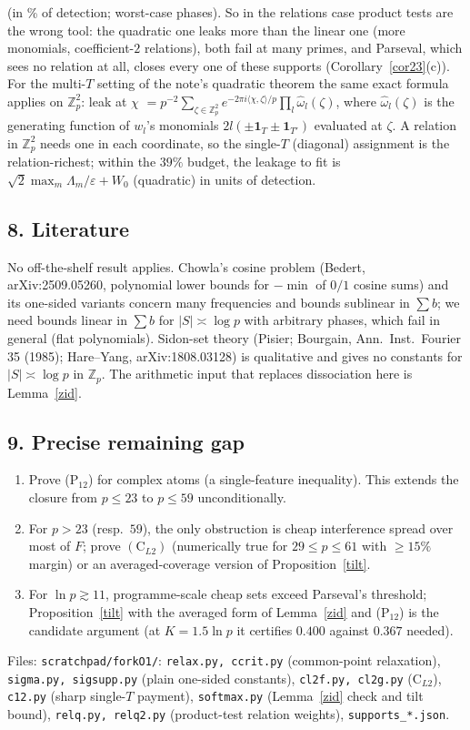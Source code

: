 \documentclass[11pt]{article}
\theoremstyle{remark}\newtheorem{remark}[theorem]{Remark}
\begin{document}
(in \% of detection; worst-case phases).  So in the relations case product tests are the wrong tool: the quadratic one leaks more than the
linear one (more monomials, coefficient-$2$ relations), both fail at many primes, and Parseval, which sees no relation at all, closes every one
of these supports (Corollary~\ref{cor23}(c)).  For the multi-$T$ setting of the note's quadratic theorem the same exact formula applies on
$\mathbb Z_p^2$: leak at $\chi$ $=p^{-2}\sum_{\zeta\in\mathbb Z_p^2}e^{-2\pi i\langle\chi,\zeta\rangle/p}\prod_l\hat\omega_l(\zeta)$, where $\hat\omega_l(\zeta)$ is the
generating function of $w_l$'s monomials $2l(\pm\mathbf1_T\pm\mathbf1_{T'})$ evaluated at $\zeta$.  A relation in $\mathbb Z_p^2$ needs one in
each coordinate, so the single-$T$ (diagonal) assignment is the relation-richest; within the $39\%$ budget, the leakage to fit is
$\sqrt2\max_m\Lambda_m/\varepsilon+W_0$ (quadratic) in units of detection.

\subsection*{8. Literature}
No off-the-shelf result applies.  Chowla's cosine problem (Bedert, arXiv:2509.05260, polynomial lower bounds for $-\min$ of $0/1$ cosine
sums) and its one-sided variants concern many frequencies and bounds sublinear in $\sum b$; we need bounds linear in $\sum b$ for
$|S|\asymp\log p$ with arbitrary phases, which fail in general (flat polynomials).  Sidon-set theory (Pisier; Bourgain, Ann.\ Inst.\ Fourier
35 (1985); Hare--Yang, arXiv:1808.03128) is qualitative and gives no constants for $|S|\asymp\log p$ in $\mathbb Z_p$.  The arithmetic input
that replaces dissociation here is Lemma~\ref{zid}.

\subsection*{9. Precise remaining gap}
\begin{enumerate}
\item[(G1)] Prove (P$_{12}$) for complex atoms (a single-feature inequality).  This extends the closure from $p\le23$ to $p\le59$ unconditionally.
\item[(G2)] For $p>23$ (resp.\ $59$), the only obstruction is cheap interference spread over most of $F$; prove $(\mathrm C_{L2})$ (numerically true
for $29\le p\le61$ with $\ge15\%$ margin) or an averaged-coverage version of Proposition~\ref{tilt}.
\item[(G3)] For $\ln p\gtrsim11$, programme-scale cheap sets exceed Parseval's threshold; Proposition~\ref{tilt} with the averaged form of
Lemma~\ref{zid} and (P$_{12}$) is the candidate argument (at $K=1.5\ln p$ it certifies $0.400$ against $0.367$ needed).
\end{enumerate}
Files: \texttt{scratchpad/forkO1/}: \texttt{relax.py, ccrit.py} (common-point relaxation), \texttt{sigma.py, sigsupp.py} (plain one-sided
constants), \texttt{cl2f.py, cl2g.py} ($\mathrm C_{L2}$), \texttt{c12.py} (sharp single-$T$ payment), \texttt{softmax.py} (Lemma~\ref{zid} check and
tilt bound), \texttt{relq.py, relq2.py} (product-test relation weights), \texttt{supports\_*.json}.
\end{document}
